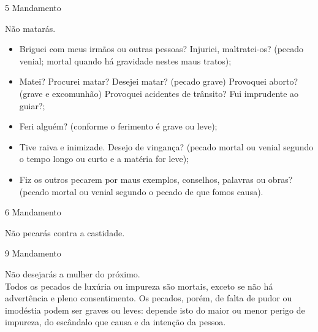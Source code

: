 \documentclass{book}
\begin{document}
\begin{center}
    5\textordmasculine{} Mandamento
\end{center}
\begin{flushleft}
    Não matarás.
\end{flushleft}
\begin{itemize}
    \item Briguei com meus irmãos ou outras pessoas? Injuriei, maltratei-os? (pecado venial; mortal quando há gravidade nestes maus tratos);
    \item Matei? Procurei matar? Desejei matar? (pecado grave) Provoquei aborto? (grave e excomunhão) Provoquei acidentes de trânsito? Fui imprudente ao guiar?;
    \item Feri alguém? (conforme o ferimento é grave ou leve);
    \item Tive raiva e inimizade. Desejo de vingança? (pecado mortal ou venial segundo o tempo longo ou curto e a matéria for leve);
    \item Fiz os outros pecarem por maus exemplos, conselhos, palavras ou obras? (pecado mortal ou venial segundo o pecado de que fomos causa).
\end{itemize}
\newpage
\begin{center}
    6\textordmasculine{} Mandamento
\end{center}
\begin{flushleft}
    Não pecarás contra a castidade.
\end{flushleft}
\begin{center}
    9\textordmasculine{} Mandamento
\end{center}
\begin{flushleft}
    Não desejarás a mulher do próximo. \\
    \hfill{} \break{}
    Todos os pecados de luxúria ou impureza são mortais, exceto se não há advertência e pleno consentimento. Os pecados, porém, de falta de pudor ou imodéstia podem ser graves ou leves: depende isto do maior ou menor perigo de impureza, do escândalo que causa e da intenção da pessoa.
\end{flushleft}
\end{document}
